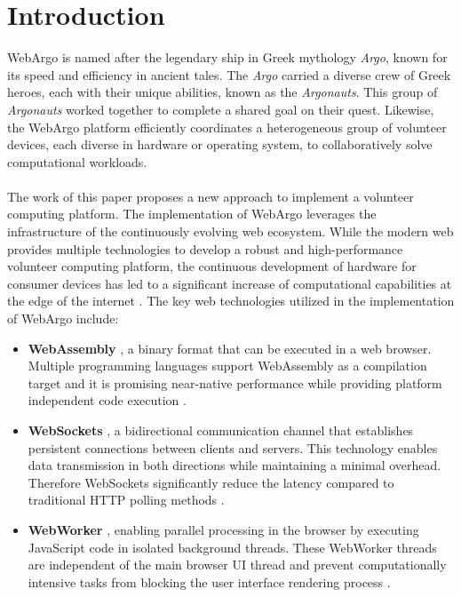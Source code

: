 \chapter{Introduction}
\label{ch:intro}
WebArgo is named after the legendary ship in Greek mythology \emph{Argo}, known for its speed and efficiency in ancient tales. The \emph{Argo} carried a diverse crew of Greek heroes, each with their unique abilities, known as the \emph{Argonauts}. This group of \emph{Argonauts} worked together to complete a shared goal on their quest. Likewise, the WebArgo platform efficiently coordinates a heterogeneous group of volunteer devices, each diverse in hardware or operating system, to collaboratively solve computational workloads.
\\~\\
The work of this paper proposes a new approach to implement a volunteer computing platform. The implementation of WebArgo leverages the infrastructure of the continuously evolving web ecosystem. While the modern web provides multiple technologies to develop a robust and high-performance volunteer computing platform, the continuous development of hardware for consumer devices has led to a significant increase of computational capabilities at the edge of the internet \cite{relatedwork:mobilecloud, relatedwork:wasmedgecomputing}. The key web technologies utilized in the implementation of WebArgo include:
\begin{itemize}
    \item \textbf{WebAssembly} \cite{methodology:wasmW3C}, a binary format that can be executed in a web browser. Multiple programming languages support WebAssembly as a compilation target and it is promising near-native performance while providing platform independent code execution \cite{methodology:wasm, methodology:wasmW3C}.
    \item \textbf{WebSockets} \cite{methodology:websockets1}, a bidirectional communication channel that establishes persistent connections between clients and servers. This technology enables data transmission in both directions while maintaining a minimal overhead. Therefore WebSockets significantly reduce the latency compared to traditional \acs{HTTP} polling methods \cite{methodology:websockets3}. 
    \item \textbf{WebWorker} \cite{methodology:webworkers}, enabling parallel processing in the browser by executing JavaScript code in isolated background threads. These WebWorker threads are independent of the main browser UI thread and prevent computationally intensive tasks from blocking the user interface rendering process \cite{methodology:webworkers}.
\end{itemize}
